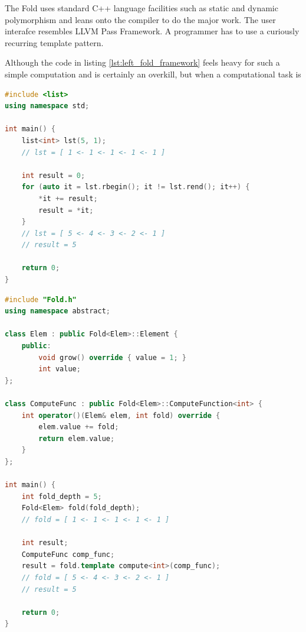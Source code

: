 The Fold uses standard C++ language facilities such as static and dynamic polymorphism and leans onto the compiler to do the major work. The user interafce resembles LLVM Pass Framework. A programmer has to use a curiously recurring template pattern.

\quad Although the code in listing \ref{lst:left_fold_framework} feels heavy for such a simple computation and is certainly an overkill, but when a computational task is 

\begin{lstlisting}[caption={Left fold computation using standard STL list class template},label={lst:left_fold_list},language=C++]
#include <list>
using namespace std;

int main() {
    list<int> lst(5, 1);
    // lst = [ 1 <- 1 <- 1 <- 1 <- 1 ]
    
    int result = 0;
    for (auto it = lst.rbegin(); it != lst.rend(); it++) {
        *it += result;
        result = *it;
    }
    // lst = [ 5 <- 4 <- 3 <- 2 <- 1 ]
    // result = 5
    
    return 0;
}
\end{lstlisting}

\begin{lstlisting}[caption={Left fold computation using our Fold computational framework},label={lst:left_fold_framework},language=C++]
#include "Fold.h"
using namespace abstract;

class Elem : public Fold<Elem>::Element {
    public:
        void grow() override { value = 1; }
        int value;
};

class ComputeFunc : public Fold<Elem>::ComputeFunction<int> {
    int operator()(Elem& elem, int fold) override {
        elem.value += fold;
        return elem.value;
    }
};

int main() {
    int fold_depth = 5;
    Fold<Elem> fold(fold_depth);
    // fold = [ 1 <- 1 <- 1 <- 1 <- 1 ]
    
    int result;
    ComputeFunc comp_func;
    result = fold.template compute<int>(comp_func);
    // fold = [ 5 <- 4 <- 3 <- 2 <- 1 ]
    // result = 5
    
    return 0;
}
\end{lstlisting}

